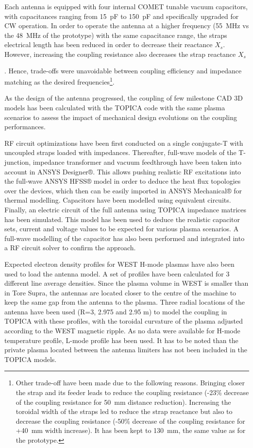 Each antenna is equipped with four internal COMET tunable vacuum capacitors, with capacitances ranging from 15~pF to 150~pF and specifically upgraded for CW operation. In order to operate the antenna at a higher frequency (55~MHz vs the 48~MHz of the prototype) with the same capacitance range, the straps electrical length has been reduced in order to decrease their reactance $X_s$. However, increasing the coupling resistance also decreases the strap reactance $X_s$ {. Hence, trade-offs were unavoidable between coupling efficiency and impedance matching as the desired frequencies\footnote{Other trade-off have been made due to the following reasons. Bringing closer the strap and its feeder leads to reduce the coupling resistance (-23\% decrease of the coupling resistance for 50~mm distance reduction). Increasing the toroidal width of the straps led to reduce the strap reactance but also to decrease the coupling resistance (-50\% decrease of the coupling resistance for +40~mm width increase). It has been kept to 130~mm, the same value as for the prototype.}. 

As the design of the antenna progressed, the coupling of few milestone CAD 3D models has been calculated with the TOPICA code  with the same plasma scenarios to assess the impact of mechanical design evolutions on the coupling performances.

RF circuit optimizations have been first conducted on a single conjugate-T with uncoupled straps loaded with impedances. Thereafter, full-wave models of the T-junction, impedance transformer and vacuum feedthrough have been taken into account in ANSYS Designer®. This allows pushing realistic RF excitations into the full-wave ANSYS HFSS® model in order to deduce the heat flux topologies over the devices, which then can be easily imported in ANSYS Mechanical® for thermal modelling. Capacitors have been modelled using equivalent circuits. Finally, an electric circuit of the full antenna using TOPICA impedance matrices has been simulated. This model has been used to deduce the realistic capacitor sets, current and voltage values to be expected for various plasma scenarios. A full-wave modelling of the capacitor has also been performed and integrated into a RF circuit solver to confirm the approach.

Expected electron density profiles for WEST H-mode plasmas have also been used to load the antenna model. A set of profiles have been calculated for 3 different line average densities. Since the plasma volume in WEST is smaller than in Tore Supra, the antennas are located closer to the centre of the machine to keep the same gap from the antenna to the plasma. Three radial locations of the antenna have been used (R=3, 2.975 and 2.95 m) to model the coupling in TOPICA with these profiles, with the toroidal curvature of the plasma adjusted according to the WEST magnetic ripple. As no data were available for H-mode temperature profile, L-mode profile has been used. It has to be noted than the private plasma located between the antenna limiters has not been included in the TOPICA models.

}
